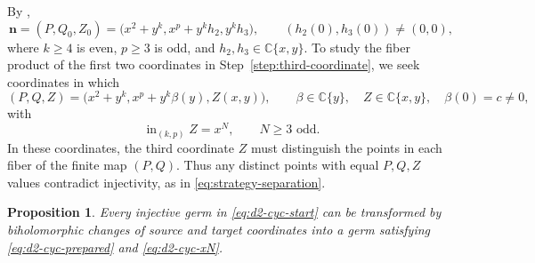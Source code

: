 \documentclass[11pt,letterpaper]{article}
\numberwithin{equation}{section}
\newtheorem{proposition}[proposition]{Proposition}
\theoremstyle{remark}
\theoremstyle{plain}
\newcommand{\C}{\mathbb{C}}
\begin{document}
By ,
\begin{equation}
 \boldsymbol n=(P,Q_0,Z_0)
 =\bigl(x^2+y^k,x^p+y^kh_2,y^kh_3\bigr),\qquad
 (h_2(0),h_3(0))\neq(0,0),                         \label{eq:d2-cyc-start}
\end{equation}
where $k\geq4$ is even, $p\geq3$ is odd, and
$h_2,h_3\in\C\{x,y\}$.  To study the fiber product of the first two
coordinates in Step~\ref{step:third-coordinate}, we seek coordinates
in which
\begin{equation}
 (P,Q,Z)=\bigl(x^2+y^k,x^p+y^k\beta(y),Z(x,y)\bigr),
 \qquad \beta\in\C\{y\},\quad Z\in\C\{x,y\},\quad \beta(0)=c\neq0,       \label{eq:d2-cyc-prepared}
\end{equation}
with
\begin{equation}
 \operatorname{in}_{(k,p)}Z=x^N,
 \qquad N\geq3\text{ odd}.                         \label{eq:d2-cyc-xN}
\end{equation}
In these coordinates, the third coordinate $Z$ must distinguish
the points in each fiber of the finite map $(P,Q)$.  Thus any distinct
points with equal $P,Q,Z$ values contradict injectivity, as
in \eqref{eq:strategy-separation}.

\begin{proposition}\label{prop:d2-cyclic-preparation}
Every injective germ in \eqref{eq:d2-cyc-start} can be transformed
by biholomorphic changes of source and target coordinates into a germ
satisfying \eqref{eq:d2-cyc-prepared} and \eqref{eq:d2-cyc-xN}.
\end{proposition}
\end{document}
